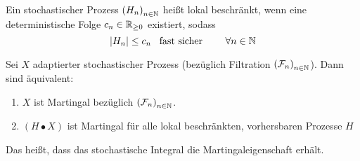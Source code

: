 \begin{*definition}
	Ein stochastischer Prozess $\left( H_n \right)_{n \in \mathbb{N}}$ heißt lokal beschränkt, wenn eine deterministische Folge $c_n \in \mathbb{R}_{\ge 0}$ existiert, sodass
	\begin{equation*}
		\left| H_n \right| \le c_n \enskip \text{ fast sicher } \qquad \forall n \in \mathbb{N}
	\end{equation*}
\end{*definition}

\begin{satz} %
	Sei $X$ adaptierter stochastischer Prozess (bezüglich Filtration $\left( \mathcal{F}_n \right)_{n \in \mathbb{N}}$). Dann sind äquivalent:
	\begin{enumerate}
		\item $X$ ist Martingal bezüglich $\left( \mathcal{F}_n \right)_{n \in \mathbb{N}}$.
		\item $(H \bullet X)$ ist Martingal für alle lokal beschränkten, vorhersbaren Prozesse $H$
	\end{enumerate}
\end{satz}

Das heißt, dass das stochastische Integral die Martingaleigenschaft erhält.

